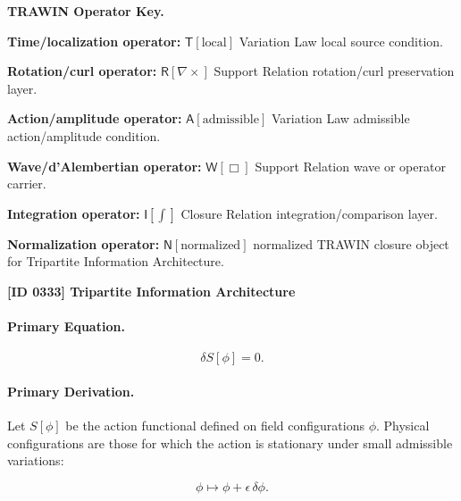 \par\vspace{0.45\baselineskip}
\noindent\begin{minipage}[t]{\linewidth}
\begingroup
\small
\raggedright
\textbf{TRAWIN Operator Key.}\par
\noindent\textbf{Time/localization operator:} $\mathsf{T}\!\left[\mathrm{local}\right]$ Variation Law local source condition.\par
\noindent\textbf{Rotation/curl operator:} $\mathsf{R}\!\left[\nabla\times\right]$ Support Relation rotation/curl preservation layer.\par
\noindent\textbf{Action/amplitude operator:} $\mathsf{A}\!\left[\mathrm{admissible}\right]$ Variation Law admissible action/amplitude condition.\par
\noindent\textbf{Wave/d'Alembertian operator:} $\mathsf{W}\!\left[\Box\right]$ Support Relation wave or operator carrier.\par
\noindent\textbf{Integration operator:} $\mathsf{I}\!\left[\int\right]$ Closure Relation integration/comparison layer.\par
\noindent\textbf{Normalization operator:} $\mathsf{N}\!\left[\mathrm{normalized}\right]$ normalized TRAWIN closure object for Tripartite Information Architecture.\par
\endgroup
\end{minipage}

\clearpage
\noindent\textbf{[ID 0333] Tripartite Information Architecture}\par
\vspace{0.35em}
\paragraph{Primary Equation.}
\begin{equation}
\delta S[\phi]=0 .
\end{equation}

\paragraph{Primary Derivation.}
Let $S[\phi]$ be the action functional defined on field configurations $\phi$.  
Physical configurations are those for which the action is stationary under small admissible variations:

\begin{equation}
\phi \mapsto \phi+\epsilon\,\delta\phi .
\end{equation}

